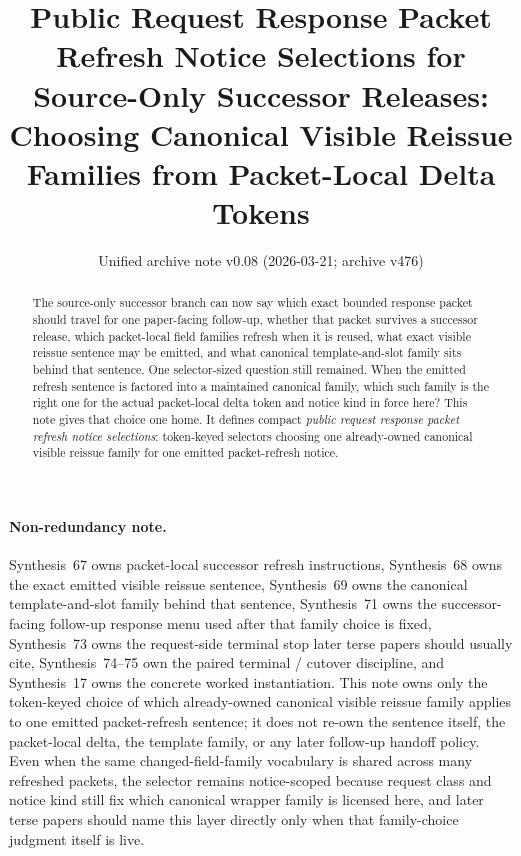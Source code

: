 \documentclass[11pt]{article}
\title{Public Request Response Packet Refresh Notice Selections for Source-Only Successor Releases:\\[0.5ex]
\large Choosing Canonical Visible Reissue Families from Packet-Local Delta Tokens}
\author{}
\date{Unified archive note v0.08 (2026-03-21; archive v476)}
\begin{document}
\maketitle

\begin{abstract}
The source-only successor branch can now say which exact bounded response packet should travel for one paper-facing follow-up, whether that packet survives a successor release, which packet-local field families refresh when it is reused, what exact visible reissue sentence may be emitted, and what canonical template-and-slot family sits behind that sentence. One selector-sized question still remained. When the emitted refresh sentence is factored into a maintained canonical family, which such family is the right one for the actual packet-local delta token and notice kind in force here? This note gives that choice one home. It defines compact \emph{public request response packet refresh notice selections}: token-keyed selectors choosing one already-owned canonical visible reissue family for one emitted packet-refresh notice.
\end{abstract}

\paragraph{Non-redundancy note.}
Synthesis~67 owns packet-local successor refresh instructions, Synthesis~68 owns the exact emitted visible reissue sentence, Synthesis~69 owns the canonical template-and-slot family behind that sentence, Synthesis~71 owns the successor-facing follow-up response menu used after that family choice is fixed, Synthesis~73 owns the request-side terminal stop later terse papers should usually cite, Synthesis~74--75 own the paired terminal / cutover discipline, and Synthesis~17 owns the concrete worked instantiation.\cite{series:publicrequestresponsepacketdeltas,series:publicrequestresponsepacketrefreshnotices,series:publicrequestresponsepacketrefreshnoticenormalforms,series:publicrequestresponsepacketrefreshresponsemenus,series:publicrequestresponsepacketrefreshresponsepacketclosureverdicts,series:pairedterminalcitationdiscipline,series:pairedterminalcutoverrule,series:workedexample}
This note owns only the token-keyed choice of which already-owned canonical visible reissue family applies to one emitted packet-refresh sentence; it does not re-own the sentence itself, the packet-local delta, the template family, or any later follow-up handoff policy. Even when the same changed-field-family vocabulary is shared across many refreshed packets, the selector remains notice-scoped because request class and notice kind still fix which canonical wrapper family is licensed here, and later terse papers should name this layer directly only when that family-choice judgment itself is live.
\end{document}
